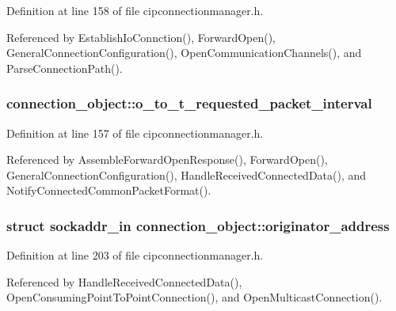 \-Definition at line 158 of file cipconnectionmanager.\-h.



\-Referenced by \-Establish\-Io\-Connction(), \-Forward\-Open(), \-General\-Connection\-Configuration(), \-Open\-Communication\-Channels(), and \-Parse\-Connection\-Path().

\hypertarget{structconnection__object_abd6b69f5689bb2a72dadb2f92b5ff6ee}{
\subsubsection[{o\-\_\-to\-\_\-t\-\_\-requested\-\_\-packet\-\_\-interval}]{ {\bf connection\-\_\-object\-::o\-\_\-to\-\_\-t\-\_\-requested\-\_\-packet\-\_\-interval}}}\label{d1/d48/structconnection__object_abd6b69f5689bb2a72dadb2f92b5ff6ee}


\-Definition at line 157 of file cipconnectionmanager.\-h.



\-Referenced by \-Assemble\-Forward\-Open\-Response(), \-Forward\-Open(), \-General\-Connection\-Configuration(), \-Handle\-Received\-Connected\-Data(), and \-Notify\-Connected\-Common\-Packet\-Format().

\hypertarget{structconnection__object_a122616a0d743a67d5333a79c57ba50b8}{
\subsubsection[{originator\-\_\-address}]{\setlength{\rightskip}{0pt plus 5cm}struct sockaddr\-\_\-in {\bf connection\-\_\-object\-::originator\-\_\-address}}}\label{d1/d48/structconnection__object_a122616a0d743a67d5333a79c57ba50b8}


\-Definition at line 203 of file cipconnectionmanager.\-h.



\-Referenced by \-Handle\-Received\-Connected\-Data(), \-Open\-Consuming\-Point\-To\-Point\-Connection(), and \-Open\-Multicast\-Connection().

